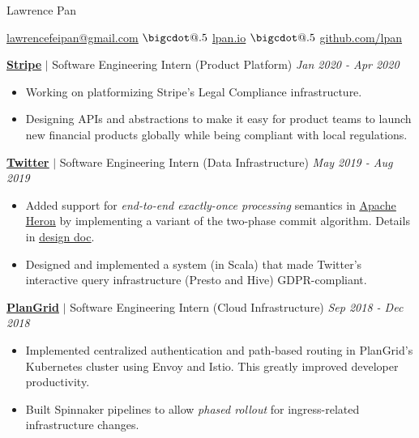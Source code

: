 \documentclass[paper=a4,fontsize=15pt]{scrartcl}
\makeatletter
\newcommand*\bigcdot{\mathpalette\bigcdot@{.5}}
\newcommand*\bigcdot@[2]{\mathbin{\vcenter{\hbox{\scalebox{#2}{$\m@th#1\bullet$}}}}}
\newcommand{\smolboispace}{\vspace*{0.1em}}
\newcommand{\halfspace}{\vspace*{0.5em}}
\newcommand{\bighalfspace}{\vspace*{0.75em}}
\newcommand{\http}[1]{\href{http://#1}{\ul{#1}}}
\newcommand{\https}[1]{\href{https://#1}{\ul{#1}}}
\newcommand{\email}[1]{\href{mailto:#1}{\ul{#1}}}
\makeatother
\begin{document}
\begin{center}
  {\fontsize{35}{40}\selectfont Lawrence Pan \par}
  \halfspace
  \smolboispace
  \smolboispace

  {\normalsize
    \email{lawrencefeipan@gmail.com}
    $\bigcdot$ \http{lpan.io}
    $\bigcdot$ \https{github.com/lpan}
    \par}
\end{center}

\bighalfspace
\normalsize
\noindent \href{https://stripe.com}{\textbf{\ul{Stripe}}}
$\vert$ \small Software Engineering Intern (Product Platform)
{\hfill \footnotesize \textit{Jan 2020 - Apr 2020}}
\begin{itemize}[noitemsep,leftmargin=20pt,label=\raisebox{0.25ex}{\tiny$\bullet$},topsep=5pt]
  \small
  \item Working on platformizing Stripe's Legal Compliance infrastructure.
  \item Designing APIs and abstractions to make it easy for product teams to
    launch new financial products globally while being compliant with local
    regulations.
\end{itemize}

\smolboispace
\smolboispace
\bighalfspace
\normalsize
\noindent \href{https://twitter.com}{\textbf{\ul{Twitter}}}
$\vert$ \small Software Engineering Intern (Data Infrastructure)
{\hfill \footnotesize \textit{May 2019 - Aug 2019}}
\begin{itemize}[noitemsep,leftmargin=20pt,label=\raisebox{0.25ex}{\tiny$\bullet$},topsep=5pt]
  \small
  \item Added support for \textit{end-to-end exactly-once processing} semantics
    in \href{https://apache.github.io/incubator-heron/}{\ul{Apache Heron}} by
    implementing a variant of the two-phase commit algorithm. Details in
    \href{https://docs.google.com/document/d/1Shqp2z-uAhsOUN2erbc2d-72wdjA8anp}{\ul{design
        doc}}.
  \item Designed and implemented a system (in Scala) that made Twitter's
    interactive query infrastructure (Presto and Hive) GDPR-compliant.
\end{itemize}

\smolboispace
\smolboispace
\bighalfspace
\normalsize
\noindent \href{https://plangrid.com}{\textbf{\ul{PlanGrid}}}
$\vert$ \small Software Engineering Intern (Cloud Infrastructure)
{\hfill \footnotesize \textit{Sep 2018 - Dec 2018}}
\begin{itemize}[noitemsep,leftmargin=20pt,label=\raisebox{0.25ex}{\tiny$\bullet$},topsep=5pt]
  \small
  \item Implemented centralized authentication and path-based routing in
    PlanGrid's Kubernetes cluster using Envoy and Istio. This greatly improved
    developer productivity.
  \item Built Spinnaker pipelines to allow \textit{phased rollout} for
    ingress-related infrastructure changes.
\end{itemize}
\end{document}
